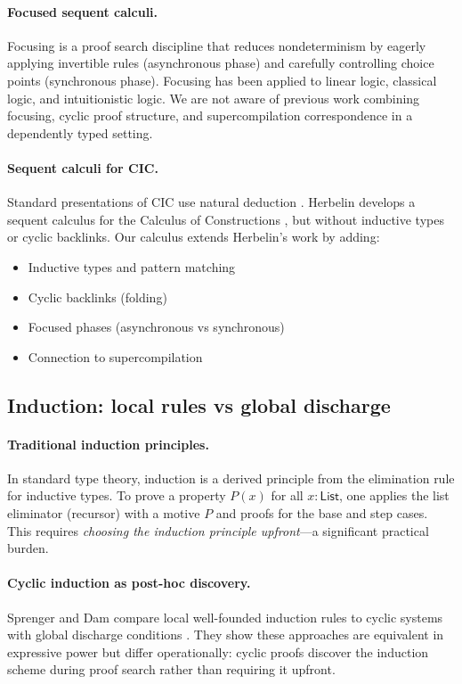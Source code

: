\paragraph{Focused sequent calculi.}
Focusing \cite{andreoli-1992-logic-programming,miller-2004-forum} is a proof search discipline that reduces nondeterminism by eagerly applying invertible rules (asynchronous phase) and carefully controlling choice points (synchronous phase).
Focusing has been applied to linear logic, classical logic, and intuitionistic logic.
We are not aware of previous work combining focusing, cyclic proof structure, and
supercompilation correspondence in a dependently typed setting.

\paragraph{Sequent calculi for CIC.}
Standard presentations of CIC use natural deduction \cite{coquand-huet-1988-coc,paulin-mohring-1993-inductive}.
Herbelin develops a sequent calculus for the Calculus of Constructions \cite{herbelin-1995-sequent-calculus}, but without inductive types or cyclic backlinks.
Our calculus extends Herbelin's work by adding:
\begin{itemize}
\item Inductive types and pattern matching
\item Cyclic backlinks (folding)
\item Focused phases (asynchronous vs synchronous)
\item Connection to supercompilation
\end{itemize}

\subsection{Induction: local rules vs global discharge}

\paragraph{Traditional induction principles.}
In standard type theory, induction is a derived principle from the elimination rule for inductive types.
To prove a property $P(x)$ for all $x : \mathsf{List}$, one applies the list eliminator (recursor) with a motive $P$ and proofs for the base and step cases.
This requires \emph{choosing the induction principle upfront}---a significant practical burden.

\paragraph{Cyclic induction as post-hoc discovery.}
Sprenger and Dam compare local well-founded induction rules to cyclic systems with global discharge conditions \cite{sprenger-dam-2003-circular-tree}.
They show these approaches are equivalent in expressive power but differ operationally: cyclic proofs discover the induction scheme during proof search rather than requiring it upfront.

